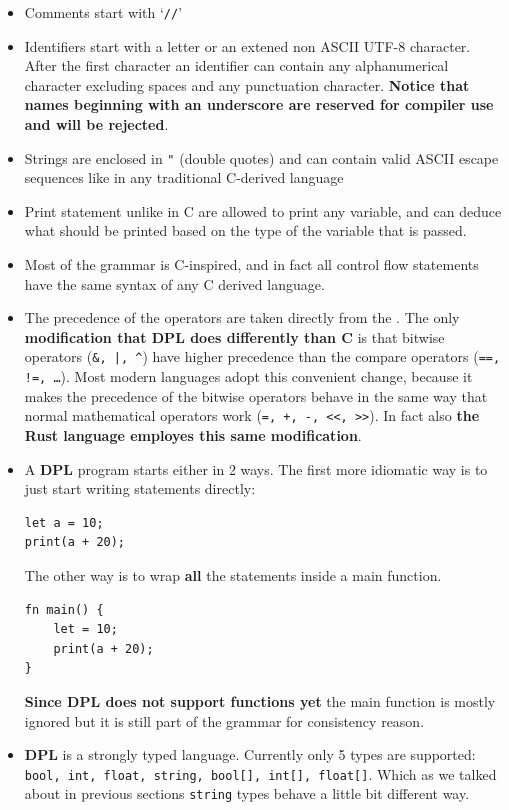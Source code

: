 \documentclass[a4paper]{article}
\newcommand{\urlref}[3][blue]{\href{#2}{\color{#1}{#3}}}%
\begin{document}
\begin{itemize}
    \item Comments start with `\texttt{//}'
    \item Identifiers start with a letter or an extened non ASCII UTF-8 character. After the first
        character an identifier can contain any alphanumerical character excluding spaces and any punctuation character.
        \textbf{Notice that names beginning with an underscore are reserved for compiler use and will be rejected}.
    \item Strings are enclosed in \texttt{"} (double quotes) and can contain valid ASCII escape sequences like
        in any traditional C-derived language
    \item Print statement unlike in C are allowed to print any variable, and can deduce what should be printed
        based on the type of the variable that is passed.
    \item Most of the grammar is C-inspired, and in fact all control flow statements have
        the same syntax of any C derived language.
    \item The precedence of the operators are taken directly from the \urlref{https://en.cppreference.com/w/c/language/operator_precedence}{C precedence table}.
        The only \textbf{modification that DPL does differently than C} is that bitwise operators (\texttt{\&, |, \^})
        have higher precedence than the compare operators (\texttt{==, !=, \dots}). Most modern languages
        adopt this convenient change, because it makes the precedence of the bitwise operators behave in the same
        way that normal mathematical operators work (\texttt{=, +, -, <<, >>}).
        In fact also \textbf{the Rust language employes this same modification}.
    \item A \textbf{DPL} program starts either in 2 ways. The first more idiomatic way is to just start
        writing statements directly:
        \begin{lstlisting}[language=DPL]
let a = 10;
print(a + 20);
        \end{lstlisting}

        The other way is to wrap \textbf{all} the statements inside a main function.

        \begin{lstlisting}[language=DPL]
fn main() {
    let = 10;
    print(a + 20);
}
        \end{lstlisting}

    \textbf{Since DPL does not support functions yet} the main function is mostly ignored but it is still
    part of the grammar for consistency reason.
    \item \textbf{DPL} is a strongly typed language. Currently only 5 types are supported: \texttt{bool, int, float, string, bool[], int[], float[]}. Which
        as we talked about in previous sections \texttt{string} types behave a little bit different way.



\end{itemize}
\end{document}
